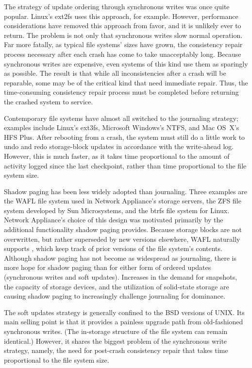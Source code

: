 The strategy of update ordering through synchronous writes was once
quite popular.  Linux's ext2fs uses this approach, for example.  However,
performance considerations have removed this approach from favor, and
it is unlikely ever to return.  The problem is not only that
synchronous writes slow normal operation.  Far more fatally, as
typical file systems' sizes have grown, the consistency repair process
necessary after each crash has come to take unacceptably long.  Because
synchronous writes are expensive, even systems of this kind use them
as sparingly as possible.  The result is that while all
inconsistencies after a crash will be reparable, some may be of the
critical kind that need immediate repair.  Thus, the time-consuming
consistency repair process must be completed before returning the crashed system to
service.

Contemporary file systems have almost all switched to the journaling
strategy; examples include Linux's ext3fs, Microsoft Windows's NTFS,
and Mac OS~X's HFS Plus.  After rebooting from a crash, the system
must still do a little work to undo and redo storage-block updates in
accordance with the write-ahead log.  However, this is much faster, as
it takes time
proportional to the amount of activity logged since the last
checkpoint, rather than time proportional to the file system size.

Shadow paging has been less widely adopted than journaling.  Three
examples are the WAFL file system used in Network Appliance's storage
servers, the ZFS file system developed by Sun Microsystems, and the
btrfs file system for Linux.  Network Appliance's choice of this design was motivated
primarily by the additional functionality shadow paging provides.  Because
storage blocks are not overwritten, but rather superseded by new versions
elsewhere, WAFL naturally supports
, which keep track of prior versions of the file
system's contents. 
Although shadow paging has not become as widespread as journaling, there is more hope for shadow paging than for either form
of ordered updates (synchronous writes and soft updates).  Increases in the demand
for snapshots, the capacity of storage devices, and the utilization of
solid-state storage are causing shadow paging to increasingly challenge
journaling for dominance.

The soft updates strategy is
generally confined to the BSD versions of UNIX.  Its main selling
point is that it provides a painless upgrade path from old-fashioned
synchronous writes.  (The in-storage structure of the file system can
remain identical.)  However, it shares the biggest problem of the
synchronous write strategy, namely, the need for post-crash consistency
repair that takes time proportional to the file system size.

